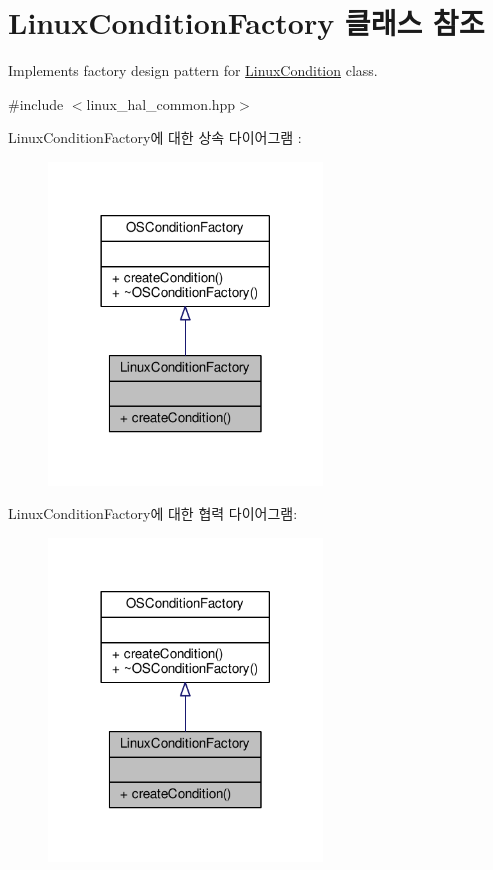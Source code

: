 \hypertarget{class_linux_condition_factory}{}\section{Linux\+Condition\+Factory 클래스 참조}
\label{class_linux_condition_factory}


Implements factory design pattern for \hyperlink{class_linux_condition}{Linux\+Condition} class.  




{\ttfamily \#include $<$linux\+\_\+hal\+\_\+common.\+hpp$>$}



Linux\+Condition\+Factory에 대한 상속 다이어그램 \+: 
\nopagebreak
\begin{figure}[H]
\begin{center}
\leavevmode
\includegraphics[width=206pt]{class_linux_condition_factory__inherit__graph}
\end{center}
\end{figure}


Linux\+Condition\+Factory에 대한 협력 다이어그램\+:
\nopagebreak
\begin{figure}[H]
\begin{center}
\leavevmode
\includegraphics[width=206pt]{class_linux_condition_factory__coll__graph}
\end{center}
\end{figure}
